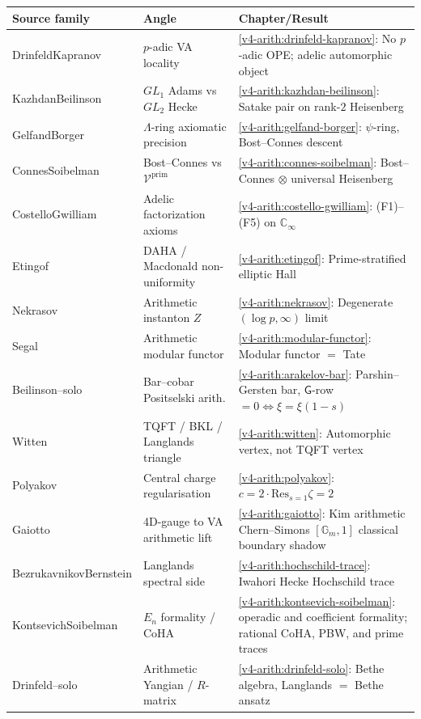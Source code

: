 \begin{longtable}{p{3.2cm}p{3.6cm}p{4.7cm}}
\toprule
Source family & Angle & Chapter/Result \\
\midrule
Drinfeld\newline Kapranov & \(p\)-adic VA locality & \ref{v4-arith:drinfeld-kapranov}: No \(p\)-adic OPE; adelic automorphic object \\
Kazhdan\newline Beilinson & \(GL_{1}\) Adams vs \(GL_{2}\) Hecke & \ref{v4-arith:kazhdan-beilinson}: Satake pair on rank-\(2\) Heisenberg \\
Gelfand\newline Borger & \(\Lambda\)-ring axiomatic precision & \ref{v4-arith:gelfand-borger}: \(\psi\)-ring, Bost--Connes descent \\
Connes\newline Soibelman & Bost--Connes vs \(\mathcal{V}^{\mathrm{prim}}\) & \ref{v4-arith:connes-soibelman}: Bost--Connes \(\otimes\) universal Heisenberg \\
Costello\newline Gwilliam & Adelic factorization axioms & \ref{v4-arith:costello-gwilliam}: (F1)--(F5) on \(\mathbb{C}_{\infty}\) \\
Etingof & DAHA / Macdonald non-uniformity & \ref{v4-arith:etingof}: Prime-stratified elliptic Hall \\
Nekrasov & Arithmetic instanton \(Z\) & \ref{v4-arith:nekrasov}: Degenerate \((\log p,\infty)\) limit \\
Segal & Arithmetic modular functor & \ref{v4-arith:modular-functor}: Modular functor \(=\) Tate \\
Beilinson--solo & Bar--cobar Positselski arith. & \ref{v4-arith:arakelov-bar}: Parshin--Gersten bar, \(\mathsf{G}\)-row \(=0\Leftrightarrow\xi=\xi(1-s)\) \\
Witten & TQFT / BKL / Langlands triangle & \ref{v4-arith:witten}: Automorphic vertex, not TQFT vertex \\
Polyakov & Central charge regularisation & \ref{v4-arith:polyakov}: \(c=2\cdot\mathrm{Res}_{s=1}\zeta=2\) \\
Gaiotto & 4D-gauge to VA arithmetic lift & \ref{v4-arith:gaiotto}: Kim arithmetic Chern--Simons \([\mathbb{G}_{m},1]\) classical boundary shadow \\
Bezrukavnikov\newline Bernstein & Langlands spectral side & \ref{v4-arith:hochschild-trace}: Iwahori Hecke Hochschild trace \\
Kontsevich\newline Soibelman & \(E_{n}\) formality / CoHA & \ref{v4-arith:kontsevich-soibelman}: operadic and coefficient formality; rational CoHA, PBW, and prime traces \\
Drinfeld--solo & Arithmetic Yangian / \(R\)-matrix & \ref{v4-arith:drinfeld-solo}: Bethe algebra, Langlands \(=\) Bethe ansatz \\
\bottomrule
\end{longtable}

